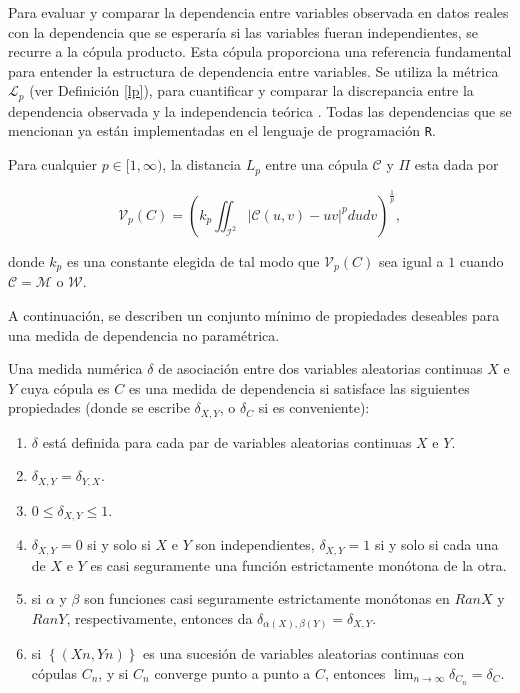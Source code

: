 Para evaluar y comparar la dependencia entre variables observada en datos reales con la dependencia que se esperaría si las variables fueran independientes, se recurre a la cópula producto. Esta cópula proporciona una referencia fundamental para entender la estructura de dependencia entre variables. Se utiliza la métrica $\mathcal{L}_p$ (ver Definición \ref{lp}), para cuantificar y comparar la discrepancia entre la dependencia observada y la independencia teórica \cite{TesisEmanuel}. Todas las dependencias que se mencionan ya están implementadas en el lenguaje de programación \texttt{R}.

\begin{defn}\label{lp}
    Para cualquier $p \in[1, \infty)$, la distancia $L_p$ entre una cópula $\mathcal{C}$ y $\Pi$ esta dada por

    \begin{equation}\label{eqLP}
        \mathcal{V}_p(C)=\left(k_p \iint_{\mathcal{I}^2}|\mathcal{C}(u, v)-u v|^p d u d v\right)^{\frac{1}{p}},
    \end{equation}

    donde $k_p$ es una constante elegida de tal modo que $\mathcal{V}_p(C)$ sea igual a $1$ cuando $\mathcal{C}=\mathcal{M}$ o $\mathcal{W}$.
\end{defn}


A continuación, se describen un conjunto mínimo de propiedades deseables para una medida de dependencia no paramétrica. 

\begin{defn}
    Una medida numérica $\delta$ de asociación entre dos variables aleatorias continuas $X$ e $Y$ cuya cópula es $C$ es una medida de dependencia si satisface las siguientes propiedades (donde se escribe $\delta_{X,Y}$, o $\delta_C$ si es conveniente):

    \begin{enumerate}
        \item $\delta$ está definida para cada par de variables aleatorias continuas $X$ e $Y$.
        \item $\delta_{X,Y} = \delta_{Y,X}$.
        
        \item $0 \leq \delta_ {X,Y} \leq 1$.
        
        \item  $\delta_{X,Y} = 0$ si y solo si $X$ e $Y$ son independientes, $\delta_{X,Y} = 1$ si y solo si cada una de $X$ e $Y$ es casi seguramente una función estrictamente monótona de la otra.
        
        \item si $\alpha$ y $\beta$ son funciones casi seguramente estrictamente monótonas en $RanX$ y $RanY$, respectivamente, entonces da $\delta_{\alpha(X), \beta(Y)} = \delta_{X,Y}$.
        
        \item si $\left\{ ( Xn ,Yn )\right\}$ es una sucesión de variables aleatorias continuas con cópulas $C_n$, y si $ C_n$ converge punto a punto a $C$, entonces $\lim_{n \to \infty} \delta_{C_n} = \delta_C$.
    \end{enumerate}
\end{defn}

